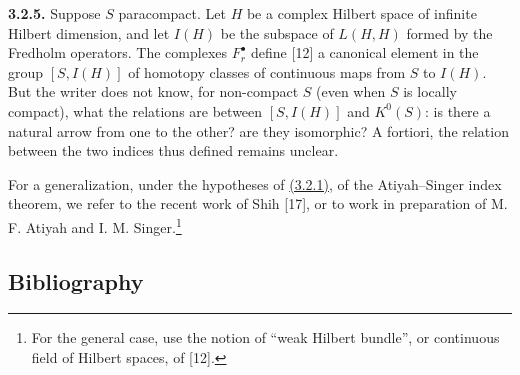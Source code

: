 \textbf{3.2.5.} Suppose $S$ paracompact. Let $H$ be a complex Hilbert space of infinite Hilbert dimension, and let $I(H)$ be the subspace of $L(H,H)$ formed by the Fredholm operators. The complexes $F_r^\bullet$ define [12] a canonical element in the group $[S,I(H)]$ of homotopy classes of continuous maps from $S$ to $I(H)$. But the writer does not know, for non-compact $S$ (even when $S$ is locally compact), what the relations are between $[S,I(H)]$ and $K^0(S)$: is there a natural arrow from one to the other? are they isomorphic? A fortiori, the relation between the two indices thus defined remains unclear.

For a generalization, under the hypotheses of \hyperlink{sga6.e02.thm.3-2-1}{(3.2.1)}, of the Atiyah--Singer index theorem, we refer to the recent work of Shih [17], or to work in preparation of M. F. Atiyah and I. M. Singer.\footnote{For the general case, use the notion of ``weak Hilbert bundle'', or continuous field of Hilbert spaces, of [12].}

\subsection*{Bibliography}

